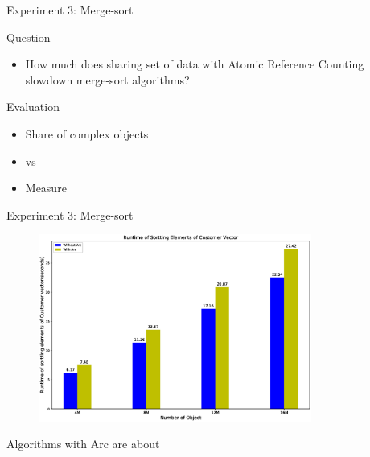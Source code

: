 \documentclass[9pt]{beamer}
\begin{document}

\begin{frame}[fragile]{Experiment 3: Merge-sort}
    
    Question
    \begin{itemize}
        \item How much does sharing set of data with Atomic Reference Counting slowdown merge-sort algorithms?
    \end{itemize} 

    Evaluation
    \begin{itemize}
        \item Share  of complex objects
        \item {} vs 
        \item Measure 
    \end{itemize}

\end{frame}



\begin{frame}[fragile]{Experiment 3: Merge-sort}

    \begin{figure}[hp]
        \centering
        \begin{center}
                \includegraphics[width=0.8\textwidth]{images/rust_merge_sort.eps}
                \captionsetup{labelformat=empty}
        \end{center}
    \end{figure}
    \vspace{-.1 cm}
    Algorithms with Arc are about 
\end{frame}
\end{document}
